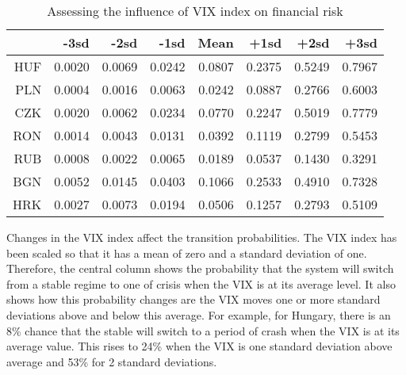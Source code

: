 \documentclass[12pt, a4paper, oneside]{article}\usepackage[]{graphicx}\usepackage[]{color}
\begin{document}
\begin{table}[t]
\begin{threeparttable}
\centering
\begin{tabular}{rrrrrrrr}
  \hline
 & -3sd & -2sd & -1sd & Mean & +1sd & +2sd & +3sd \\ 
  \hline
  HUF & 0.0020 & 0.0069 & 0.0242 & 0.0807 & 0.2375 & 0.5249 & 0.7967 \\ 
  PLN & 0.0004 & 0.0016 & 0.0063 & 0.0242 & 0.0887 & 0.2766 & 0.6003 \\ 
  CZK & 0.0020 & 0.0062 & 0.0234 & 0.0770 & 0.2247 & 0.5019 & 0.7779 \\ 
  RON & 0.0014 & 0.0043 & 0.0131 & 0.0392 & 0.1119 & 0.2799 & 0.5453 \\ 
  RUB & 0.0008 & 0.0022 & 0.0065 & 0.0189 & 0.0537 & 0.1430 & 0.3291 \\
  BGN & 0.0052 & 0.0145 & 0.0403 & 0.1066 & 0.2533 & 0.4910 & 0.7328 \\ 
  HRK & 0.0027 & 0.0073 & 0.0194 & 0.0506 & 0.1257 & 0.2793 & 0.5109 \\ 
   \hline
\end{tabular}
\begin{tablenotes}
\small
\item Changes in the VIX index affect the transition probabilities.  The VIX index has been scaled so that it has a mean of zero and a standard deviation of one.  Therefore, the central column shows the probability that the system will switch from a stable regime to one of crisis when the VIX is at its average level.  It also shows how this probability changes are the VIX moves one or more standard deviations above and below this average. For example, for Hungary, there is an 8\% chance that the stable will switch to a period of crash when the VIX is at its average value.  This rises to 24\% when the VIX is one standard deviation above average and 53\% for 2 standard deviations.  
\end{tablenotes}
\caption{Assessing the influence of VIX index on financial risk} 
\label{tabref:vixtranprob}
\end{threeparttable}
\end{table}
\end{document}

